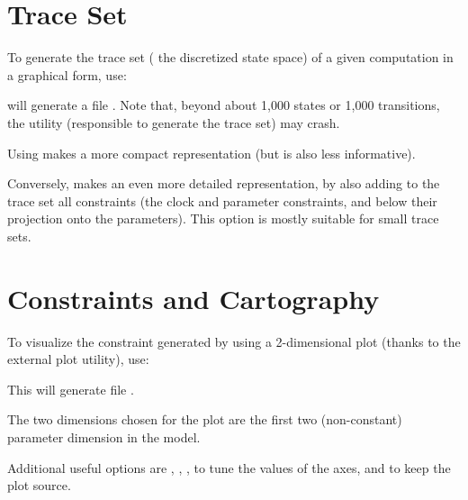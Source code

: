 \section{Trace Set}

To generate the trace set (\ie{} the discretized state space) of a given computation in a graphical form, use:


\imitator{} will generate a file .
Note that, beyond about 1,000 states or 1,000 transitions, the \gdot{} utility (responsible to generate the trace set) may crash.

Using  makes a more compact representation (but is also less informative).

Conversely,  makes an even more detailed representation, by also adding to the trace set all constraints (the clock and parameter constraints, and below their projection onto the parameters).
This option is mostly suitable for small trace sets.



\section{Constraints and Cartography}

To visualize the constraint generated by \imitator{} using a 2-dimensional plot (thanks to the external plot utility), use:


This will generate file .

The two dimensions chosen for the plot are the first two (non-constant) parameter dimension in the model.

Additional useful options are
,
,
,
to tune the values of the axes,
and  to keep the plot source.


